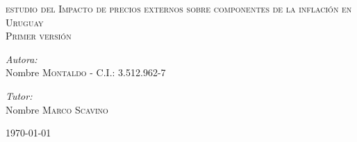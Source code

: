 \documentclass[a4paper,12pt]{article} %
\begin{document}
%
\renewcommand{\contentsname}{Tabla de contenidos}      %
\renewcommand{\tablename}{\bfseries Tabla}             %
\renewcommand{\figurename}{\bfseries Figura}           %
\newcommand{\subfigureautorefname}{\figureautorefname} %

\begin{titlepage}
	
	\begin{center}
	
	\textsc{\Large  estudio del Impacto de precios externos sobre componentes de la inflación en Uruguay}\\[1.5cm] %
	
	\textsc{\LARGE Primer versión}\\[0.5cm] %
	
	
	\vspace{-0.5cm}
	
	\noindent
	\begin{flushleft} \large
		\emph{Autora:}\\
		Nombre \textsc{Montaldo} - C.I.: 3.512.962-7 \\

		
		\vspace{0.5cm}
		
		\emph{Tutor:} \\
		Nombre \textsc{Marco Scavino}
	\end{flushleft}
	\vfill
	
	{\large \today}
	
	\end{center}
\end{titlepage}
\end{document}

